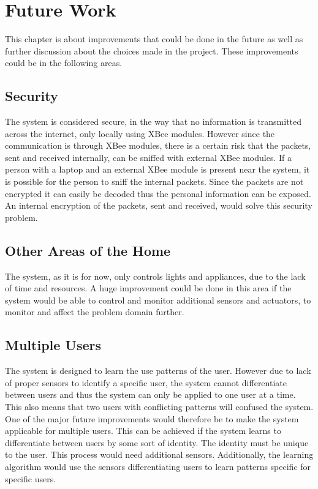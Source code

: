 \chapter{Future Work}
\label{chap:future_work}
This chapter is about improvements that could be done in the future as well as further discussion about the choices made in the project. These improvements could be in the following areas.

\section{Security}
The system is considered secure, in the way that no information is transmitted across the internet, only locally using XBee modules. However since the communication is through XBee modules, there is a certain risk that the packets, sent and received internally, can be sniffed with external XBee modules. If a person with a laptop and an external XBee module is present near the system, it is possible for the person to sniff the internal packets. Since the packets are not encrypted it can easily be decoded thus the personal information can be exposed. An internal encryption of the packets, sent and received, would solve this security problem.

\section{Other Areas of the Home}
The system, as it is for now, only controls lights and appliances, due to the lack of time and resources. A huge improvement could be done in this area if the system would be able to control and monitor additional sensors and actuators, to monitor and affect the problem domain further.

\section{Multiple Users}
The system is designed to learn the use patterns of the user. However due to lack of proper sensors to identify a specific user, the system cannot differentiate between users and thus the system can only be applied to one user at a time. This also means that two users with conflicting patterns will confused the system. One of the major future improvements would therefore be to make the system applicable for multiple users. This can be achieved if the system learns to differentiate between users by some sort of identity. The identity must be unique to the user. This process would need additional sensors. Additionally, the learning algorithm would use the sensors differentiating users to learn patterns specific for specific users.

